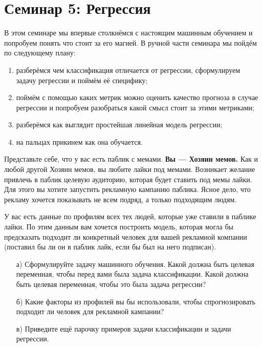 \documentclass[12pt, a4paper, oneside]{article}
\theoremstyle{plain} %
\theoremstyle{definition}
\newcounter{problem}%
\renewcommand{\theproblem}{\arabic{problem}}
\newenvironment{problem}[1]{
\addtocounter{problem}{1}\noindent{ \color{titleblue} \large \bfseries Упражнение~\theproblem~#1 \vspace{1ex} \newline}
}{ }
\newcommand{\indef}[1]{\textbf{ \color{green} #1}}
\begin{document}

\toggletrue{lecture}

\section*{Семинар 5: Регрессия}

В этом семинаре мы впервые столкнёмся с настоящим машинным обучением и попробуем понять что стоит за его магией. В ручной части семинара мы пойдём по следующему  плану: 

\begin{enumerate}
\item разберёмся чем классификация отличается от регрессии, сформулируем задачу регрессии и поймём её специфику;
\item поймём с помощью каких метрик можно оценить качество прогноза в случае регрессии и попробуем разобраться какой смысл стоит за этими метриками;
\item разберёмся как выглядит простейшая линейная модель регрессии;
\item на пальцах прикинем как она обучается.
\end{enumerate}

\begin{problem}{(ставим задачу)}
Представьте себе, что у вас есть паблик с мемами. \indef{Вы --- Хозяин мемов.} Как и любой другой Хозяин мемов, вы любите лайки под мемами. Возникает желание привлечь в паблик целевую аудиторию, которая будет ставить под мемы лайки. Для этого вы хотите запустить рекламную кампанию паблика. Ясное дело, что рекламу хочется показывать не всем подряд,  а только подходящим людям. 

У вас есть данные по профилям всех тех людей, которые уже ставили в паблике лайки. По этим данным вам хочется построить модель, которая могла бы предсказать подходит ли конкретный человек для вашей рекламной компании (поставил бы ли он в паблик лайк, если бы был на него подписан). 

\begin{enumerate}
\item[а)] Сформулируйте задачу машинного обучения. Какой должна быть целевая переменная, чтобы перед вами была задача классификации. Какой должна быть целевая переменная, чтобы это была задача регрессии? 

\item[б)] Какие факторы из профилей вы бы использовали, чтобы спрогнозировать подходит ли человек для рекламной кампании?

\item[в)] Приведите ещё парочку примеров задачи классификации и задачи регрессии. 
\end{enumerate}
\end{problem}
\end{document}
